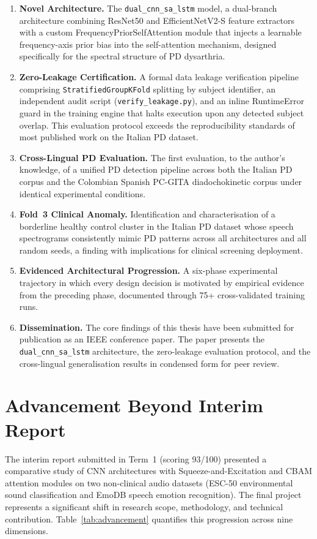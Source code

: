 \documentclass[oneside,openany]{final_report}
\newcommand{\dualcnn}{\texttt{dual\_cnn\_sa\_lstm}}
\begin{document}
\begin{enumerate}
    \item \textbf{Novel Architecture.} The \dualcnn{} model, a dual-branch architecture combining ResNet50 and EfficientNetV2-S feature extractors with a custom FrequencyPriorSelfAttention module that injects a learnable frequency-axis prior bias into the self-attention mechanism, designed specifically for the spectral structure of PD dysarthria.
    \item \textbf{Zero-Leakage Certification.} A formal data leakage verification pipeline comprising \texttt{StratifiedGroupKFold} splitting by subject identifier, an independent audit script (\texttt{verify\_leakage.py}), and an inline RuntimeError guard in the training engine that halts execution upon any detected subject overlap. This evaluation protocol exceeds the reproducibility standards of most published work on the Italian PD dataset.
    \item \textbf{Cross-Lingual PD Evaluation.} The first evaluation, to the author's knowledge, of a unified PD detection pipeline across both the Italian PD corpus and the Colombian Spanish PC-GITA diadochokinetic corpus under identical experimental conditions.
    \item \textbf{Fold~3 Clinical Anomaly.} Identification and characterisation of a borderline healthy control cluster in the Italian PD dataset whose speech spectrograms consistently mimic PD patterns across all architectures and all random seeds, a finding with implications for clinical screening deployment.
    \item \textbf{Evidenced Architectural Progression.} A six-phase experimental trajectory in which every design decision is motivated by empirical evidence from the preceding phase, documented through 75+ cross-validated training runs.
    \item \textbf{Dissemination.} The core findings of this thesis have been submitted for publication as an IEEE conference paper. The paper presents the \dualcnn{} architecture, the zero-leakage evaluation protocol, and the cross-lingual generalisation results in condensed form for peer review.
\end{enumerate}

\section{Advancement Beyond Interim Report}
\label{sec:advancement}

The interim report submitted in Term~1 (scoring 93/100) presented a comparative study of CNN architectures with Squeeze-and-Excitation and CBAM attention modules on two non-clinical audio datasets (ESC-50 environmental sound classification and EmoDB speech emotion recognition). The final project represents a significant shift in research scope, methodology, and technical contribution. Table~\ref{tab:advancement} quantifies this progression across nine dimensions.
\end{document}
